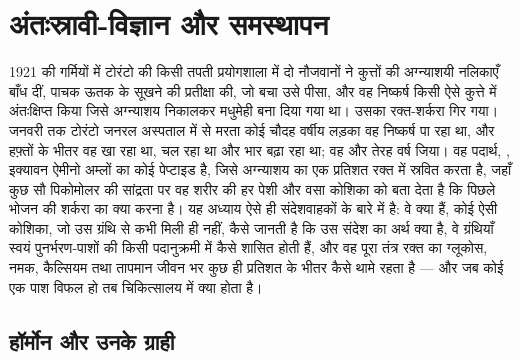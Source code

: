 \chapter{अंतःस्रावी-विज्ञान और समस्थापन}\label{ch:b3:endocrinology}

1921 की गर्मियों में टोरंटो की किसी तपती प्रयोगशाला में दो नौजवानों ने
कुत्तों की अग्न्याशयी नलिकाएँ बाँध दीं, पाचक ऊतक के सूखने की प्रतीक्षा
की, जो बचा उसे पीसा, और वह निष्कर्ष किसी ऐसे कुत्ते में अंतःक्षिप्त
किया जिसे अग्न्याशय निकालकर मधुमेही बना दिया गया था। उसका रक्त-शर्करा
गिर गया। जनवरी तक टोरंटो जनरल अस्पताल में  से मरता कोई
चौदह वर्षीय लड़का वह निष्कर्ष पा रहा था, और हफ़्तों के भीतर वह खा रहा
था, चल रहा था और भार बढ़ा रहा था; वह और तेरह वर्ष जिया। वह पदार्थ,
, इक्यावन ऐमीनो अम्लों का कोई पेप्टाइड है, जिसे अग्न्याशय का एक
प्रतिशत रक्त में स्रवित करता है, जहाँ कुछ सौ पिकोमोलर की सांद्रता पर वह
शरीर की हर पेशी और वसा कोशिका को बता देता है कि पिछले भोजन की शर्करा का
क्या करना है। यह अध्याय ऐसे ही संदेशवाहकों के बारे में है: वे क्या हैं,
कोई ऐसी कोशिका, जो उस ग्रंथि से कभी मिली ही नहीं, कैसे जानती है कि उस
संदेश का अर्थ क्या है, वे ग्रंथियाँ स्वयं पुनर्भरण-पाशों की किसी
पदानुक्रमी में कैसे शासित होती हैं, और वह पूरा तंत्र रक्त का ग्लूकोस,
नमक, कैल्सियम तथा तापमान जीवन भर कुछ ही प्रतिशत के भीतर कैसे थामे रहता
है --- और जब कोई एक पाश विफल हो तब चिकित्सालय में क्या होता है।

\section{हॉर्मोन और उनके ग्राही}


